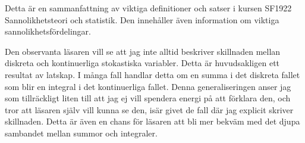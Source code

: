 Detta är en sammanfattning av viktiga definitioner och satser i kursen SF1922 Sannolikhetsteori och statistik. Den innehåller även information om viktiga sannolikhetsfördelingar.

Den observanta läsaren vill se att jag inte alltid beskriver skillnaden mellan diskreta och kontinuerliga stokastiska variabler. Detta är huvudsakligen ett resultat av latskap. I många fall handlar detta om en summa i det diskreta fallet som blir en integral i det kontinuerliga fallet. Denna generaliseringen anser jag som tillräckligt liten till att jag ej vill spendera energi på att förklara den, och tror att läsaren själv vill kunna se den, isär givet de fall där jag explicit skriver skillnaden. Detta är även en chans för läsaren att bli mer bekväm med det djupa sambandet mellan summor och integraler.
